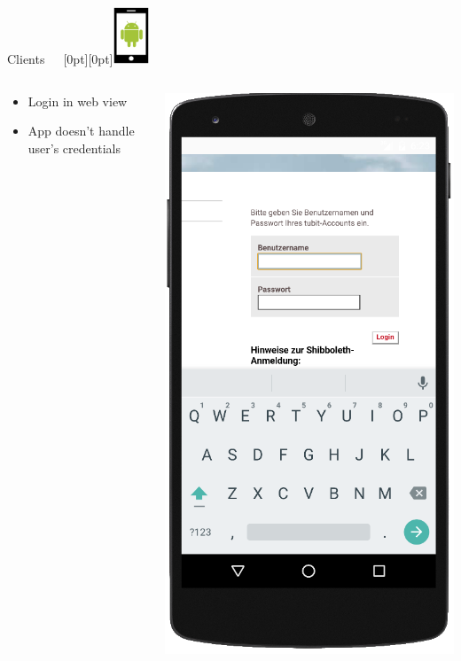 \documentclass[11pt]{beamer}
\begin{document}
\begin{frame}{Clients~~~\raisebox{-10pt}[0pt][0pt]{\includegraphics[width=0.08\textwidth]{tech-stack-android}}}

\begin{columns}[T]
	\begin{column}{.6\textwidth}
	\begin{itemize}
		\item Login in web view
		\item App doesn't handle user's credentials
	\end{itemize}
	\end{column}
	\begin{column}{.4\textwidth}
	\includegraphics[scale=0.27]{android_login}

\end{column}
\end{columns}
\end{frame}
\end{document}
